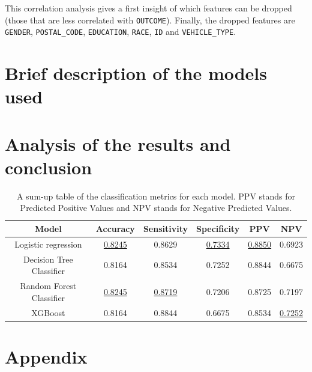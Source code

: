 \documentclass[a4paper,11pt, titlepage]{article}
\begin{document}
\noindent This correlation analysis gives a first insight of which features can be dropped (those that are less correlated with {\tt OUTCOME}). Finally, the dropped features are {\tt GENDER}, {\tt POSTAL\_CODE}, {\tt EDUCATION}, {\tt RACE}, {\tt ID} and {\tt VEHICLE\_TYPE}.


\section{Brief description of the models used} \label{models}





\section{Analysis of the results and conclusion} \label{results}
\begin{table}[h!]
    \begin{tabular}[t]{|c|ccccc|}
        \rowcolor{orange!30}
\hline
\textbf{Model} & \textbf{Accuracy} & \textbf{Sensitivity} & \textbf{Specificity} & \textbf{PPV} & \textbf{NPV} \\
\hline
Logistic regression         & \underline{0.8245} & 0.8629 & \underline{0.7334} & \underline{0.8850} & 0.6923 \\
Decision Tree Classifier    & 0.8164          & 0.8534 & 0.7252 & 0.8844 & 0.6675 \\
Random Forest Classifier    & \underline{0.8245} & \underline{0.8719} & 0.7206 & 0.8725 & 0.7197 \\
XGBoost                     & 0.8164          & 0.8844 & 0.6675 & 0.8534 & \underline{0.7252} \\
\hline
    \end{tabular}
\centering
\caption{A sum-up table of the classification metrics for each model. PPV stands for Predicted Positive Values and NPV stands for Negative Predicted Values.}
\label{metrics}
\end{table}%

\appendix


\section{Appendix}
\end{document}
